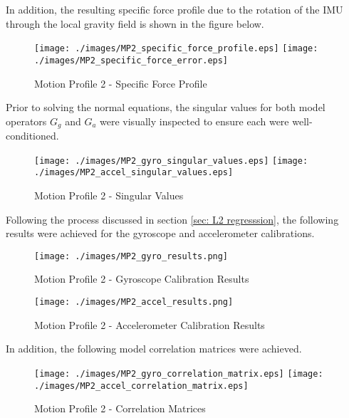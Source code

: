 In addition, the resulting specific force profile due to the rotation of the IMU through the local gravity field is shown in the figure below. 

\begin{figure}[!h] 
	\centering
	\texttt{[image: ./images/MP2\_specific\_force\_profile.eps]} \hfill
	\texttt{[image: ./images/MP2\_specific\_force\_error.eps]}
	\caption{Motion Profile 2 - Specific Force Profile}
	\label{fig: MP2 specific force profile}
\end{figure}
\FloatBarrier

Prior to solving the normal equations, the singular values for both model operators $G_g$ and $G_a$ were visually inspected to ensure each were well-conditioned. 

\begin{figure}[!h] 
	\centering
	\texttt{[image: ./images/MP2\_gyro\_singular\_values.eps]} \hfill
	\texttt{[image: ./images/MP2\_accel\_singular\_values.eps]}
	\caption{Motion Profile 2 - Singular Values}
	\label{fig: MP2 singular values}
\end{figure}
\FloatBarrier

Following the process discussed in section \ref{sec: L2 regresssion}, the following results were achieved for the gyroscope and accelerometer calibrations. 

\begin{figure}[h] 
	\centering
	\texttt{[image: ./images/MP2\_gyro\_results.png]}
	\caption{Motion Profile 2 - Gyroscope Calibration Results}
	\label{fig: MP2 gyro results}
\end{figure}
\FloatBarrier

\begin{figure}[h] 
	\centering
	\texttt{[image: ./images/MP2\_accel\_results.png]}
	\caption{Motion Profile 2 - Accelerometer Calibration Results}
	\label{fig: MP2 accel results}
\end{figure}
\FloatBarrier

In addition, the following model correlation matrices were achieved.

\begin{figure}[!h] 
	\centering
	\texttt{[image: ./images/MP2\_gyro\_correlation\_matrix.eps]} \hfill
	\texttt{[image: ./images/MP2\_accel\_correlation\_matrix.eps]}
	\caption{Motion Profile 2 - Correlation Matrices}
	\label{fig: MP2 correlation matrix}
\end{figure}
\FloatBarrier

